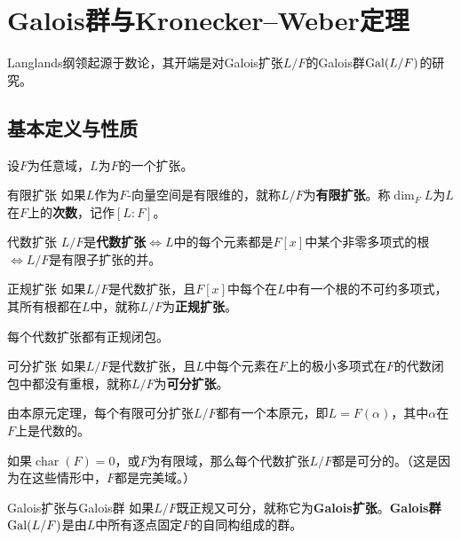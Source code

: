 \chapter{Galois群与Kronecker--Weber定理}\label{L1}
Langlands纲领起源于数论，其开端是对Galois扩张$L/F$的Galois群$\operatorname{Gal}(L/F)$的研究。
\section{基本定义与性质}\label{L1S1}
设$F$为任意域，$L$为$F$的一个扩张。
\begin{definition*}{有限扩张}
如果$L$作为$F$-向量空间是有限维的，就称$L/F$为\textbf{有限扩张}。称$\dim_F L$为$L$在$F$上的\textbf{次数}，记作$[L:F]$。
\end{definition*}
\begin{definition*}{代数扩张}
$L/F$是\textbf{代数扩张}$\iff L$中的每个元素都是$F[x]$中某个非零多项式的根$\iff L/F$是有限子扩张的并。
\end{definition*}
\begin{definition*}{正规扩张}
如果$L/F$是代数扩张，且$F[x]$中每个在$L$中有一个根的不可约多项式，其所有根都在$L$中，就称$L/F$为\textbf{正规扩张}。
\end{definition*}
\begin{property}每个代数扩张都有正规闭包。\end{property}
\begin{definition*}{可分扩张}
如果$L/F$是代数扩张，且$L$中每个元素在$F$上的极小多项式在$F$的代数闭包中都没有重根，就称$L/F$为\textbf{可分扩张}。
\end{definition*}
\begin{property}由本原元定理，每个有限可分扩张$L/F$都有一个本原元，即$L=F(\alpha)$，其中$\alpha$在$F$上是代数的。\end{property}
\begin{property}如果$\operatorname{char}(F)=0$，或$F$为有限域，那么每个代数扩张$L/F$都是可分的。（这是因为在这些情形中，$F$都是完美域。）\end{property}
\begin{definition*}{Galois扩张与Galois群}
如果$L/F$既正规又可分，就称它为\textbf{Galois扩张}。\textbf{Galois群}$\operatorname{Gal}(L/F)$是由$L$中所有逐点固定$F$的自同构组成的群。
\end{definition*}
